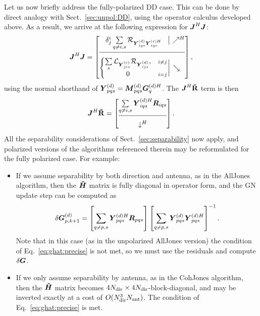 \documentclass[useAMS,usenatbib]{mn2e}
\makeatletter
\newcommand{\mat}[1]{{\bmath{#1}}}
\newcommand{\JJ}{\mat{J}} %
\newcommand{\HHa}{\mat{\tilde{H}}} %
\newcommand{\RR}{\mat{R}}
\newcommand{\GG}{\mat{G}}
\newcommand{\JHJ}{\JJ^H\JJ} %
\newcommand{\Matrix}[2]{\left [ \begin{array}{@{}#1@{}}#2\end{array} \right ]}
\newcommand{\AUGx}[1]{\mathbf{\breve{#1}}}
\newcommand{\RRr}{\AUGx{R}}
\newcommand{\Rop}[1]{\mathcal{R}_{{#1}}}
\newcommand{\Lop}[1]{\mathcal{L}_{{#1}}}
\numberwithin{equation}{section}
\makeatother
\begin{document}
Let us now briefly address the fully-polarized DD case. This can be done by direct analogy with
Sect.~\ref{sec:unpol:DD}, using the operator calculus developed above. As a result, we arrive at the
following expression for $\JHJ$:
\begin{equation}
\label{eq:JHJ:DD:pol}
  \JHJ = \JHJblocks{
  \delta^i_j \sum\limits_{q\ne i,s} \Rop{\YYd_{iqs} \YYcH_{iqs}} 
  }{
  \left \{ 
  \begin{array}{@{}cc@{}}
   \sum\limits_{s} \Lop{ \YYc_{jis}  } \Rop{\YYd_{ijs}},&{\scriptstyle i\ne j} \\
   0 &{\scriptstyle i=j}
  \end{array} \right . 
  }
,
\end{equation}
using the normal shorthand of $\YYd_{pqs} = \MMd_{pqs} \GGdH_q$. The $\JJ^H\RRr$ term is then
\newcommand{\CCC}{\mathcal{C}}
\begin{equation}
\label{eq:JHR:DD:pol}
\JJ^H\RRr = \Matrix{c}{
\sum\limits_{q\ne i,s} \YYdH_{iqs} \RR_{iqs} \\
\hline\\[-8pt]
\downarrow^H}.
\end{equation}
All the separability considerations of Sect.~\ref{sec:separability} now apply, and polarized versions of the 
algorithms referenced therein may be reformulated for the fully polarized case. For example:

\begin{itemize} 
\item If we assume separability by both direction and antenna, as in the {\sc AllJones} algorithm, then
the $\HHa$ matrix is fully diagonal in operator form, and the GN update step can be computed as
\begin{equation}
\label{eq:update:DD:diag:pol}
\delta \GGd_{p,k+1} = 
\left [ \sum\limits_{q\ne p,s} \YYdH_{pqs} \RR_{pqs} \right ]
\left [ \sum\limits_{q\ne p,s} \YYd_{pqs} \YYdH_{pqs}  \right ]^{-1}.
\end{equation}
Note that in this case (as in the unpolarized {\sc AllJones} version) the condition of Eq.~\ref{eq:ghat:precise}
is not met, so we must use the residuals and compute $\delta\GG$.

\item If we only assume separability by antenna, as in the {\sc CohJones} algorithm, then the $\HHa$ matrix 
becomes $4N_\mathrm{dir}\times4N_\mathrm{dir}$-block-diagonal, and may be inverted exactly at a cost of $O(N_\mathrm{dir}^3N_\mathrm{ant})$. The condition 
of Eq.~\ref{eq:ghat:precise} is met.
\end{itemize}
\end{document}
